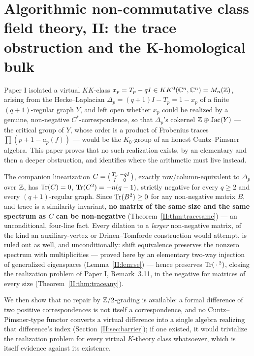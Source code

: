 \chapter[II. The trace obstruction and the K-homological bulk]{Algorithmic non-commutative class field theory, II: the trace obstruction and the K-homological bulk}\label{chap:II}
\begin{chapterabstract}
Paper I isolated a virtual $KK$-class $x_p=T_p-qI\in KK^0(\mathbb{C}^n,\mathbb{C}^n)=M_n(\mathbb{Z})$, arising
from the Hecke--Laplacian $\Delta_p=(q+1)I-T_p=1-x_p$ of a finite $(q+1)$-regular graph
$Y$, and left open whether $x_p$ could be realized by a genuine, non-negative
$C^*$-correspondence, so that $\Delta_p$'s cokernel $\mathbb{Z}\oplus\operatorname{Jac}(Y)$ --- the critical
group of $Y$, whose order is a product of Frobenius traces $\prod(p+1-a_p(f))$ ---
would be the $K_0$-group of an honest Cuntz--Pimsner algebra. This paper proves that no
such realization exists, by an elementary and then a deeper obstruction, and identifies
where the arithmetic must live instead.

The companion linearization $C=\begin{psmallmatrix}T_p&-qI\\I&0\end{psmallmatrix}$,
exactly row/column-equivalent to $\Delta_p$ over $\mathbb{Z}$, has
$\operatorname{Tr}(C)=0$, $\operatorname{Tr}(C^2)=-n(q-1)$, strictly negative for every $q\ge2$ and every
$(q+1)$-regular graph. Since $\operatorname{Tr}(B^2)\ge0$ for any non-negative matrix $B$, and trace is
a similarity invariant, \textbf{no matrix of the same size and the same spectrum as $C$
can be non-negative} (Theorem~\ref{II:thm:tracesame}) --- an unconditional, four-line fact.
Every dilation to a \emph{larger} non-negative matrix, of the kind an
auxiliary-vertex or Drinen--Tomforde construction would attempt, is ruled out as well,
and unconditionally: shift equivalence preserves the nonzero spectrum with
multiplicities --- proved here by an elementary two-way injection of generalized
eigenspaces (Lemma~\ref{II:lem:se}) --- hence preserves $\operatorname{Tr}(\,\cdot\,^2)$, closing the
realization problem of Paper I, Remark~3.11, in the negative for matrices of every size
(Theorem~\ref{II:thm:traceany}).

We then show that no repair by $\mathbb{Z}/2$-grading is available: a formal difference of two
positive correspondences is not itself a correspondence, and no Cuntz--Pimsner-type
functor converts a virtual difference into a single algebra realizing that difference's
index (Section~\ref{II:sec:barrier}); if one existed, it would trivialize the realization
problem for every virtual $K$-theory class whatsoever, which is itself evidence against
its existence.


\end{chapterabstract}
